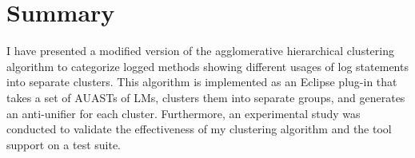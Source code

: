 \section{Summary} \label{meth2-summary}
I have presented a modified version of the agglomerative hierarchical clustering algorithm to categorize logged methods showing different usages of log statements into separate clusters. This algorithm is implemented as an Eclipse plug-in that takes a set of AUASTs of LMs, clusters them into separate groups, and generates an anti-unifier for each cluster. Furthermore, an experimental study was conducted to validate the effectiveness of my clustering algorithm and the tool support on a test suite.




